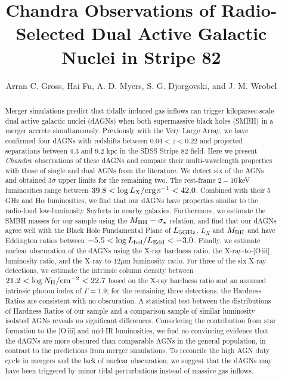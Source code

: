 \documentclass[iop,revtex4,twocolumn,apj,numberedappendix,appendixfloats]{emulateapj}
\newcommand{\chandra}{{\it Chandra}}
\begin{document}
\title{Chandra Observations of Radio-Selected Dual Active Galactic Nuclei in Stripe 82}

\author{
Arran C. Gross, 
Hai Fu, 
A. D. Myers,
S. G. Djorgovski, and
J. M. Wrobel
}

\begin{abstract}
Merger simulations predict that tidally induced gas inflows can trigger kiloparsec-scale dual active galactic nuclei (dAGNs) when both supermassive black holes (SMBH) in a merger accrete simultaneously. Previously with the Very Large Array, we have confirmed four dAGNs with redshifts between $0.04 < z < 0.22$ and projected separations between 4.3 and 9.2 kpc in the SDSS Stripe 82 field. Here we present \chandra\, observations of these dAGNs and compare their multi-wavelength properties with those of single and dual AGNs from the literature. We detect six of the AGNs and obtained 3$\sigma$ upper limits for the remaining two. The rest-frame $2-10$\,keV luminosities range between $39.8 < \log L_{\rm X}/{\rm erg\,s^{-1}} < 42.0$. Combined with their 5\,GHz and H$\alpha$ luminosities, we find that our dAGNs have properties similar to the radio-loud low-luminosity Seyferts in nearby galaxies. Furthermore, we estimate the SMBH masses for our sample using the $M_{\rm BH}-\sigma_\star$ relation, and find that our dAGNs agree well with the Black Hole Fundamental Plane of $L_{\rm 5GHz}$, $L_X$ and $M_{\rm BH}$ and have Eddington ratios between $-5.5 < \log L_{\rm bol}/L_{\rm Edd} < -3.0$. Finally, we estimate nuclear obscuration of the dAGNs using the X-ray hardness ratio, the X-ray-to-[O\,{\sc iii}] luminosity ratio, and the X-ray-to-12$\mu$m luminosity ratio. For three of the six X-ray detections, we estimate the intrinsic column density between $21.2 < \log N_{\rm H}/{\rm cm^{-2}} < 22.7$ based on the X-ray hardness ratio and an assumed intrinsic photon index of $\Gamma = 1.9$; for the remaining three detections, the Hardness Ratios are consistent with no obscuration. A statistical test between the distributions of Hardness Ratios of our sample and a comparison sample of similar luminosity isolated AGNs reveals no significant differences. Considering the  contribution from star formation to the [O\,{\sc iii}] and mid-IR luminosities, we find no convincing evidence that the dAGNs are more obscured than comparable AGNs in the general population, in contrast to the predictions from merger simulations. To reconcile the high AGN duty cycle in mergers and the lack of nuclear obscuration, we suggest that the dAGNs may have been triggered by minor tidal perturbations instead of massive gas inflows. 
\end{abstract}
\end{document}

